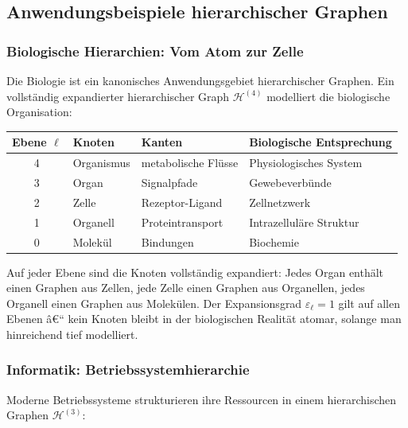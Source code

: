 ﻿\documentclass[12pt,a4paper,twoside]{article}
\theoremstyle{definition}
\theoremstyle{plain}
\theoremstyle{remark}
\begin{document}
\subsection{Anwendungsbeispiele hierarchischer Graphen}
\label{sub:anwendungen_hierarchie}

\subsubsection{Biologische Hierarchien: Vom Atom zur Zelle}

Die Biologie ist ein kanonisches Anwendungsgebiet hierarchischer
Graphen.  Ein vollständig expandierter hierarchischer Graph
$\mathcal{H}^{(4)}$ modelliert die biologische Organisation:

\begin{center}
	\begin{tabular}{clll}
		\toprule
		Ebene $\ell$ & Knoten & Kanten & Biologische Entsprechung \\
		\midrule
		4 & Organismus & metabolische Flüsse & Physiologisches System \\
		3 & Organ      & Signalpfade         & Gewebeverbünde         \\
		2 & Zelle      & Rezeptor-Ligand     & Zellnetzwerk           \\
		1 & Organell   & Proteintransport    & Intrazelluläre Struktur \\
		0 & Molekül    & Bindungen           & Biochemie              \\
		\bottomrule
	\end{tabular}
\end{center}

Auf jeder Ebene sind die Knoten vollständig expandiert: Jedes Organ enthält einen Graphen aus Zellen, jede Zelle einen Graphen aus Organellen, jedes Organell einen Graphen aus Molekülen. Der Expansionsgrad $\varepsilon_\ell = 1$ gilt auf allen Ebenen â€“ kein Knoten bleibt in der biologischen Realität atomar, solange man hinreichend tief modelliert.

\subsubsection{Informatik: Betriebssystemhierarchie}

Moderne Betriebssysteme strukturieren ihre Ressourcen in einem
hierarchischen Graphen $\mathcal{H}^{(3)}$:
\end{document}
